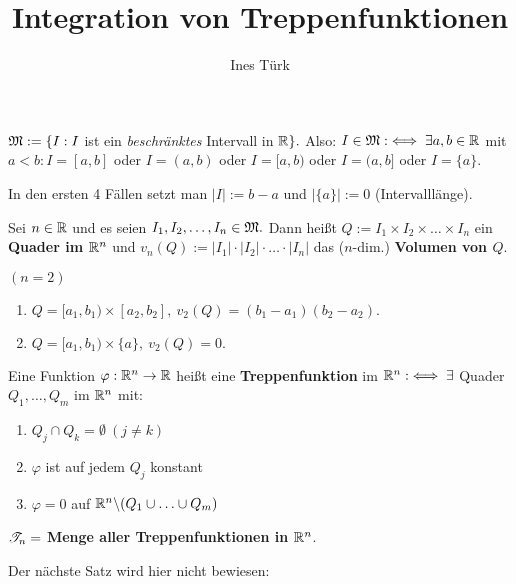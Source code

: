 \documentclass{article}
\title{Integration von Treppenfunktionen}
\author{Ines Türk}
\begin{document}
\maketitle

\begin{definition}
\begin{liste}
\item $\mathfrak{M}:=\{I:I$ ist ein \emph{beschränktes} Intervall in $\mathbb{R}\}.$ Also: $I\in\mathfrak{M}:\iff\exists a,b\in\mathbb{R}$ mit $a<b: I=[a,b]$ oder $I=(a,b)$ oder $I=[a,b)$ oder $I=(a,b]$ oder $I=\{a\}.$

In den ersten 4 Fällen setzt man $|I|:=b-a$ und $|\{a\}|:=0$ (Intervalllänge).

\item Sei $n\in\mathbb{R}$ und es seien $I_1,I_2,\ldots,I_n\in\mathfrak{M}.$ Dann heißt $Q:=I_1\times I_2\times \ldots \times I_n$ ein \textbf{Quader im $\mathbb{R}^n$} und $v_n(Q):=|I_1|\cdot |I_2|\cdot \ldots \cdot |I_n|$ das ($n$-dim.) \textbf{Volumen von $Q$}.
\begin{beispiel}
$(n=2)$
\begin{enumerate}
\item $Q = [a_1,b_1) \times [a_2,b_2],\ v_2(Q) = (b_1-a_1)(b_2-a_2).$
\item $Q = [a_1,b_1) \times \{a\},\ v_2(Q) = 0.$
\end{enumerate}
\end{beispiel}

\item Eine Funktion $\varphi:\mathbb{R}^n\to\mathbb{R}$ heißt eine \textbf{Treppenfunktion} im $\mathbb{R}^n :\iff \exists$ Quader $Q_1,\ldots,Q_m$ im $\mathbb{R}^n$ mit:
\begin{enumerate}
\item $Q_j\cap Q_k=\emptyset\ (j\ne k)$
\item $\varphi$ ist auf jedem $Q_j$ konstant
\item $\varphi=0$ auf $\mathbb{R}^n\backslash(Q_1\cup\ldots\cup Q_m)$
\end{enumerate}

$\mathscr{T}_n =$ \textbf{Menge aller Treppenfunktionen in $\mathbb{R}^n$}.

\end{liste}
\end{definition}

Der nächste Satz wird hier nicht bewiesen:
\end{document}
